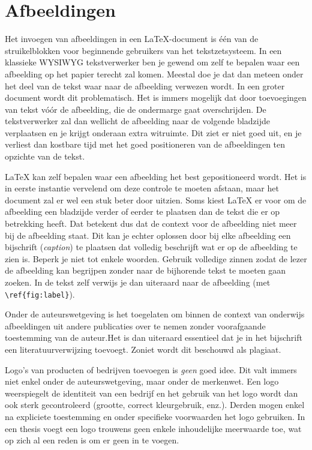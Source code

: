%

\section{Afbeeldingen}
\label{sec:afbeeldingen}

Het invoegen van afbeeldingen in een {\LaTeX}-document is \'e\'en van de struikelblokken voor beginnende gebruikers van het tekstzetsysteem. In een klassieke WYSIWYG tekstverwerker ben je gewend om zelf te bepalen waar een afbeelding op het papier terecht zal komen. Meestal doe je dat dan meteen onder het deel van de tekst waar naar de afbeelding verwezen wordt. In een groter document wordt dit problematisch. Het is immers mogelijk dat door toevoegingen van tekst vóór de afbeelding, die de ondermarge gaat overschrijden. De tekstverwerker zal dan wellicht de afbeelding naar de volgende bladzijde verplaatsen en je krijgt onderaan extra witruimte. Dit ziet er niet goed uit, en je verliest dan kostbare tijd met het goed positioneren van de afbeeldingen ten opzichte van de tekst.

{\LaTeX} kan zelf bepalen waar een afbeelding het best gepositioneerd wordt. Het is in eerste instantie vervelend om deze controle te moeten afstaan, maar het document zal er wel een stuk beter door uitzien. Soms kiest {\LaTeX} er voor om de afbeelding een bladzijde verder of eerder te plaatsen dan de tekst die er op betrekking heeft. Dat betekent dus dat de context voor de afbeelding niet meer bij de afbeelding staat. Dit kan je echter oplossen door bij elke afbeelding een bijschrift (\emph{caption}) te plaatsen dat volledig beschrijft wat er op de afbeelding te zien is. Beperk je niet tot enkele woorden. Gebruik volledige zinnen zodat de lezer de afbeelding kan begrijpen zonder naar de bijhorende tekst te moeten gaan zoeken. In de tekst zelf verwijs je dan uiteraard naar de afbeelding (met \verb|\ref{fig:label}|).


Onder de auteurswetgeving is het toegelaten om binnen de context van onderwijs afbeeldingen uit andere publicaties over te nemen zonder voorafgaande toestemming van de auteur.Het is dan uiteraard essentieel dat je in het bijschrift een literatuurverwijzing toevoegt. Zoniet wordt dit beschouwd als plagiaat.

Logo's van producten of bedrijven toevoegen is \emph{geen} goed idee. Dit valt immers niet enkel onder de auteurswetgeving, maar onder de merkenwet. Een logo weerspiegelt de identiteit van een bedrijf en het gebruik van het logo wordt dan ook sterk gecontroleerd (grootte, correct kleurgebruik, enz.). Derden mogen enkel na expliciete toestemming en onder specifieke voorwaarden het logo gebruiken. In een thesis voegt een logo trouwens geen enkele inhoudelijke meerwaarde toe, wat op zich al een reden is om er geen in te voegen.

